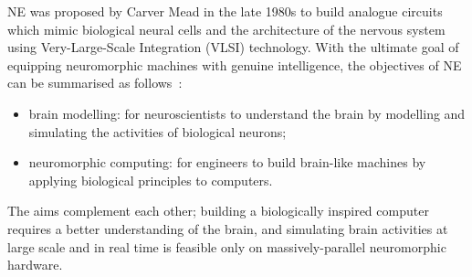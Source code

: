 NE was proposed by Carver Mead in the late 1980s \citep{Mead:1989:AVN:64998} to build analogue circuits which mimic biological neural cells and the architecture of the nervous system using Very-Large-Scale Integration (VLSI) technology.
With the ultimate goal of equipping neuromorphic machines with genuine intelligence, 
the objectives of NE can be summarised as follows~\citep{furber2007neural}:
\begin{itemize}
	\item brain modelling: for neuroscientists to understand the brain by modelling and simulating the activities of biological neurons; 
	\item neuromorphic computing: for engineers to build brain-like machines by applying biological principles to computers.
\end{itemize}
The aims complement each other; building a biologically inspired computer requires a better understanding of the brain, and simulating brain activities at large scale and in real time is feasible only on massively-parallel neuromorphic hardware.




